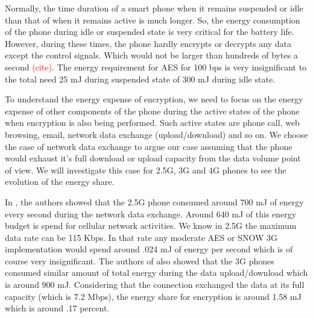 Normally, the time duration of a smart phone when it remains suspended or idle than that of when it remains active is much longer. So, the energy consumption of the phone during idle or suspended state is very critical for the battery life. However, during these times, the phone hardly encrypts or decrypts any data except the control signals. Which would not be larger than hundreds of bytes a second \textcolor{red}{(cite)}. The energy requirement for AES for 100 bps is very insignificant to the total need 25 mJ during suspended state of 300 mJ during idle state.

To understand the energy expense of encryption, we need to focus on the energy expense of other components of the phone during the active states of the phone when encryption is also being performed. Such active states are phone call, web browsing, email, network data exchange (upload/download) and so on. We choose the case of network data exchange to argue our case assuming that the phone would exhaust it's full download or upload capacity from the data volume point of view. We will investigate this case for 2.5G, 3G and 4G phones to see the evolution of the energy share.


In \cite{Usenix_2010}, the authors showed that the 2.5G phone consumed around 700 mJ of energy every second during the network data exchange. Around 640 mJ of this energy budget is spend for cellular network activities. We know in 2.5G the maximum data rate can be 115 Kbps. In that rate any moderate AES or SNOW 3G implementation would spend around .024 mJ of energy per second which is of course very insignificant. The authors of \cite{Usenix_2010} also showed that the 3G phones consumed similar amount of total energy during the data upload/download which is around 900 mJ. Considering that the connection exchanged the data at its full capacity (which is 7.2 Mbps), the energy share for encryption is around 1.58 mJ which is around .17 percent. 

